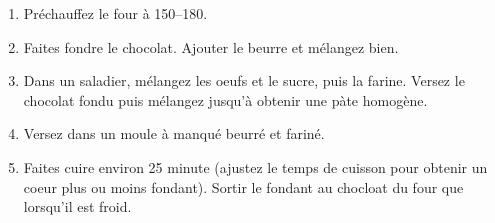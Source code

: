 
\begin{ingredients}
\end{ingredients}


\begin{recipe}
  \begin{enumerate}
  \item Pr\'echauffez le four \`a 150--180\C.

  \item Faites fondre le chocolat.  Ajouter le beurre et m\'elangez bien.

  \item Dans un saladier, m\'elangez les oeufs et le sucre, puis la
    farine. Versez le chocolat fondu puis m\'elangez jusqu'\`a
    obtenir une p\`ate homog\`ene.
    
  \item Versez dans un moule \`a manqu\'e beurr\'e et farin\'e.

  \item Faites cuire environ 25 minute (ajustez le temps de cuisson
    pour obtenir un coeur plus ou moins fondant).  Sortir le fondant
    au chocloat du four que lorsqu'il est froid.

  \end{enumerate}

\end{recipe}
